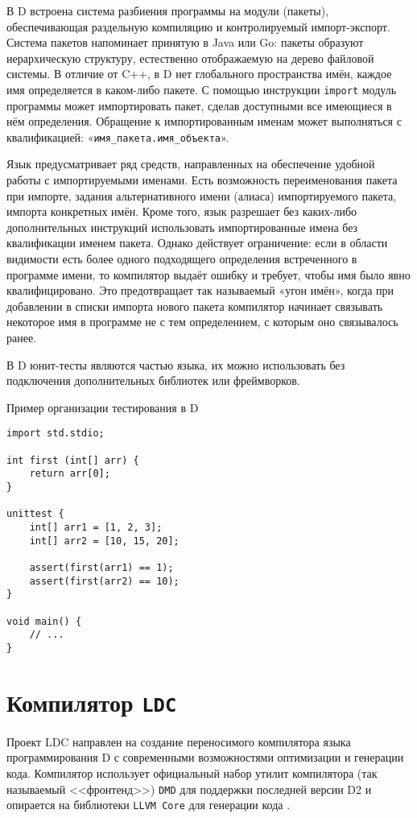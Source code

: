 \documentclass[732]{studrep}
\begin{document}
В D встроена система разбиения программы на модули (пакеты), обеспечивающая раздельную компиляцию и контролируемый импорт-экспорт. Система пакетов напоминает принятую в Java или Go: пакеты образуют иерархическую структуру, естественно отображаемую на дерево файловой системы. В отличие от C++, в D нет глобального пространства имён, каждое имя определяется в каком-либо пакете. С помощью инструкции \texttt{import} модуль программы может импортировать пакет, сделав доступными все имеющиеся в нём определения. Обращение к импортированным именам может выполняться с квалификацией: «\texttt{имя\_пакета.имя\_объекта}».

Язык предусматривает ряд средств, направленных на обеспечение удобной работы с импортируемыми именами. Есть возможность переименования пакета при импорте, задания альтернативного имени (алиаса) импортируемого пакета, импорта конкретных имён. Кроме того, язык разрешает без каких-либо дополнительных инструкций использовать импортированные имена без квалификации именем пакета. Однако действует ограничение: если в области видимости есть более одного подходящего определения встреченного в программе имени, то компилятор выдаёт ошибку и требует, чтобы имя было явно квалифицировано. Это предотвращает так называемый «угон имён», когда при добавлении в списки импорта нового пакета компилятор начинает связывать некоторое имя в программе не с тем определением, с которым оно связывалось ранее.

В D юнит-тесты являются частью языка, их можно использовать без подключения дополнительных библиотек или фреймворков.

\begin{listing}
\caption{Пример организации тестирования в D}
\begin{verbatim}
import std.stdio;

int first (int[] arr) {
    return arr[0];
}

unittest {
    int[] arr1 = [1, 2, 3];
    int[] arr2 = [10, 15, 20];

    assert(first(arr1) == 1);
    assert(first(arr2) == 10);
}

void main() {
    // ...
}
\end{verbatim}
\end{listing}

\section{Компилятор \texttt{LDC}}

Проект LDC направлен на создание переносимого компилятора языка программирования D с современными возможностями оптимизации и генерации кода. Компилятор использует официальный набор утилит компилятора (так называемый <<фронтенд>>) \texttt{DMD} для поддержки последней версии D2 и опирается на библиотеки \texttt{LLVM Core} для генерации кода \cite{ldcwiki}.
\end{document}
